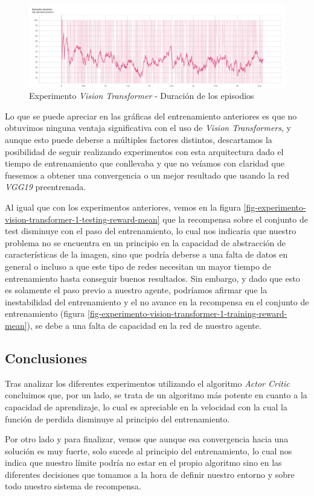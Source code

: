 \begin{figure}[H]
	\centering
	\includegraphics[width=1\textwidth]{figuras/experiments/vision transformers/episodes_duration.png}
	\caption[Experimento \textit{Vision Transformer} - Duración de los episodios]{Experimento \textit{Vision Transformer} - Duración de los episodios}
	\label{fig-experimento-vision-transformer-1-episodes-duration}
\end{figure}

Lo que se puede apreciar en las gráficas del entrenamiento anteriores es que no obtuvimos ninguna ventaja significativa con el uso de \textit{Vision Transformers}, y aunque esto puede deberse a múltiples factores distintos, descartamos la posibilidad de seguir realizando experimentos con esta arquitectura dado el tiempo de entrenamiento que conllevaba y que no veíamos con claridad que fuesemos a obtener una convergencia o un mejor resultado que usando la red \textit{VGG19} preentrenada.
\medskip

Al igual que con los experimentos anteriores, vemos en la figura \ref{fig-experimento-vision-transformer-1-testing-reward-mean} que la recompensa sobre el conjunto de test disminuye con el paso del entrenamiento, lo cual nos indicaria que nuestro problema no se encuentra en un principio en la capacidad de abstracción de características de la imagen, sino que podría deberse a una falta de datos en general o incluso a que este tipo de redes necesitan un mayor tiempo de entrenamiento hasta conseguir buenos resultados. Sin embargo, y dado que esto es solamente el paso previo a nuestro agente, podríamos afirmar que la inestabilidad del entrenamiento y el no avance en la recompensa en el conjunto de entrenamiento (figura \ref{fig-experimento-vision-transformer-1-training-reward-mean}), se debe a una falta de capacidad en la red de nuestro agente.
\medskip

\subsection{Conclusiones}
\label{resultados-conclusiones-actor-critic-experimentos}

Tras analizar los diferentes experimentos utilizando el algoritmo \textit{Actor Critic} concluimos que, por un lado, se trata de un algoritmo más potente en cuanto a la capacidad de aprendizaje, lo cual es apreciable en la velocidad con la cual la función de perdida disminuye al principio del entrenamiento.
\medskip

Por otro lado y para finalizar, vemos que aunque esa convergencia hacia una solución es muy fuerte, solo sucede al principio del entrenamiento, lo cual nos indica que nuestro límite podría no estar en el propio algoritmo sino en las diferentes decisiones que tomamos a la hora de definir nuestro entorno y sobre todo nuestro sistema de recompensa.
\medskip